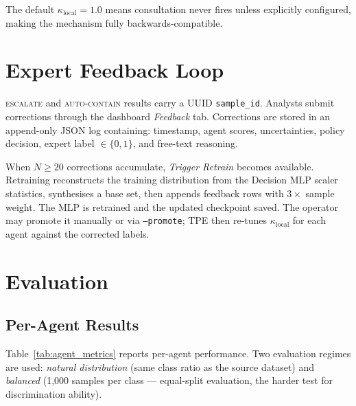 \documentclass[12pt,a4paper]{article}
\begin{document}
The default $\kappa_{\text{local}} = 1.0$ means consultation never fires unless
explicitly configured, making the mechanism fully backwards-compatible.

\section{Expert Feedback Loop}
\label{sec:feedback}

\textsc{escalate} and \textsc{auto-contain} results carry a UUID \texttt{sample\_id}.
Analysts submit corrections through the dashboard \textit{Feedback} tab. Corrections
are stored in an append-only JSON log containing: timestamp, agent scores, uncertainties,
policy decision, expert label $\in \{0, 1\}$, and free-text reasoning.

When $N \geq 20$ corrections accumulate, \textit{Trigger Retrain} becomes available.
Retraining reconstructs the training distribution from the Decision MLP scaler
statistics, synthesises a base set, then appends feedback rows with $3\times$ sample
weight. The MLP is retrained and the updated checkpoint saved. The operator may promote
it manually or via \texttt{--promote}; TPE then re-tunes $\kappa_{\text{local}}$ for
each agent against the corrected labels.

\section{Evaluation}
\label{sec:eval}

\subsection{Per-Agent Results}

Table~\ref{tab:agent_metrics} reports per-agent performance. Two evaluation regimes are
used: \textit{natural distribution} (same class ratio as the source dataset) and
\textit{balanced} (1,000 samples per class — equal-split evaluation, the harder test for
discrimination ability).
\end{document}
